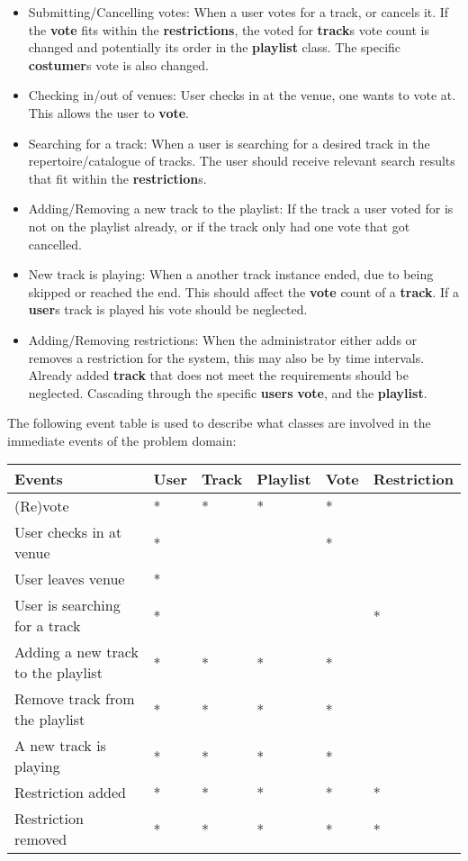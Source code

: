 \begin{itemize}
\item Submitting/Cancelling votes:
    When a user votes for a track, or cancels it. If the \textbf{vote} fits within the \textbf{restrictions}, the voted for \textbf{track}s vote count is changed and potentially its order in the \textbf{playlist} class. The specific \textbf{costumer}s vote is also changed.
\item Checking in/out of venues:
    User checks in at the venue, one wants to vote at. This allows the user to \textbf{vote}.
\item Searching for a track:
    When a user is searching for a desired track in the repertoire/catalogue of tracks. The user should receive relevant search results that fit within the \textbf{restriction}s.
\item Adding/Removing a new track to the playlist:
    If the track a user voted for is not on the playlist already, or if the track only had one vote that got cancelled.
\item New track is playing:
    When a another track instance ended, due to being skipped or reached the end. This should affect the \textbf{vote} count of a \textbf{track}. If a \textbf{user}s track is played his vote should be neglected.
\item Adding/Removing restrictions:
    When the administrator either adds or removes a restriction for the system, this may also be by time intervals. Already added \textbf{track} that does not meet the requirements should be neglected. Cascading through the specific \textbf{users} \textbf{vote}, and the \textbf{playlist}.
\end{itemize}

The following event table is used to describe what classes are involved in the immediate events of the problem domain:

\begin{center}
\label{eventtable}
    \begin{tabular}{|l|l|l|l|l|l|}
    \hline
    \textbf{Events} & User & Track & Playlist & Vote & Restriction \\ \hline
    (Re)vote & * & * & * & * &   \\ \hline
    User checks in at venue & * &   &   & * &   \\ \hline
    User leaves venue & * &   &   &   &   \\ \hline
    User is searching for a track & * &   &   &  & * \\ \hline
    Adding a new track to the playlist & * & * & * & * &   \\ \hline
    Remove track from the playlist & * & * & * & * &   \\ \hline
    A new track is playing & * & * & * & * &   \\ \hline
    Restriction added & * & * & * & * & * \\ \hline
    Restriction removed & * & * & * & * & * \\ \hline
    \end{tabular}
\end{center}

